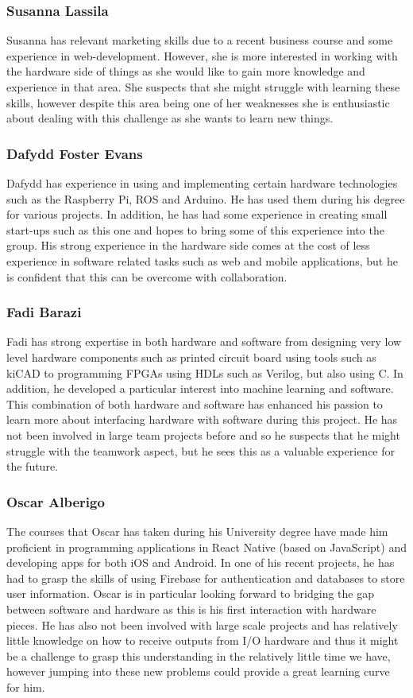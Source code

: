 \documentclass{article}
\begin{document}
\subsubsection{Susanna Lassila}
Susanna has relevant marketing skills due to a recent business course and some experience in web-development. However, she is more interested in working with the hardware side of things as she would like to gain more knowledge and experience in that area. She suspects that she might struggle with learning these skills, however despite this area being one of her weaknesses she is enthusiastic about dealing with this challenge as she wants to learn new things.

\subsubsection{Dafydd Foster Evans}
Dafydd has experience in using and implementing certain hardware technologies such as the Raspberry Pi, ROS and Arduino. He has used them during his degree for various projects. In addition, he has had some experience in creating small start-ups such as this one and hopes to bring some of this experience into the group. His strong experience in the hardware side comes at the cost of less experience in software related tasks such as web and mobile applications, but he is confident that this can be overcome with collaboration.

\subsubsection{Fadi Barazi}
Fadi has strong expertise in both hardware and software from designing very low level hardware components such as printed circuit board using tools such as kiCAD to programming FPGAs using HDLs such as Verilog, but also using C. In addition, he developed a particular interest into machine learning and software. This combination of both hardware and software has enhanced his passion to learn more about interfacing hardware with software during this project. He has not been involved in large team projects before and so he suspects that he might struggle with the teamwork aspect, but he sees this as a valuable experience for the future.

\subsubsection{Oscar Alberigo}
The courses that Oscar has taken during his University degree have made him proficient in programming applications in React Native (based on JavaScript) and developing apps for both iOS and Android. In one of his recent projects, he has had to grasp the skills of using Firebase for authentication and databases to store user information. Oscar is in particular looking forward to bridging the gap between software and hardware as this is his first interaction with hardware pieces. He has also not been involved with large scale projects and has relatively little knowledge on how to receive outputs from I/O hardware and thus it might be a challenge to grasp this understanding in the relatively little time we have, however jumping into these new problems could provide a great learning curve for him.
\end{document}

